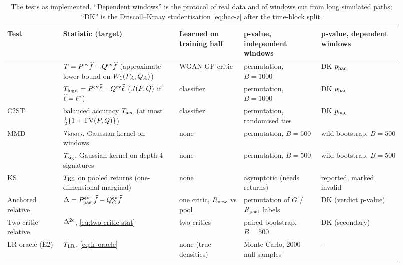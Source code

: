 \begin{table}[tbp]
  \centering
  \caption{The tests as implemented. ``Dependent windows'' is the protocol of real data and of
    windows cut from long simulated paths; ``DK'' is the Driscoll--Kraay studentisation
    \eqref{eq:hac-z} after the time-block split.}
  \label{tab:method-tests}
  \footnotesize
  \setlength{\tabcolsep}{4pt}
  \begin{tabular}{@{}>{\raggedright\arraybackslash}p{0.13\linewidth}
                  >{\raggedright\arraybackslash}p{0.27\linewidth}
                  >{\raggedright\arraybackslash}p{0.15\linewidth}
                  >{\raggedright\arraybackslash}p{0.18\linewidth}
                  >{\raggedright\arraybackslash}p{0.19\linewidth}@{}}
    \toprule
    Test & Statistic (target) & Learned on training half & p-value, independent windows &
    p-value, dependent windows \\
    \midrule
    \WC{} & $T=P^{\mathrm{ev}}\widehat{f}-Q^{\mathrm{ev}}\widehat{f}$ (approximate lower bound on $W_{1}(P_A,Q_A)$) & WGAN-GP critic &
      permutation, $B=1000$ & DK $p_{\mathrm{hac}}$ \\
    \LRC{} & $T_{\mathrm{logit}}=P^{\mathrm{ev}}\widehat{\ell}-Q^{\mathrm{ev}}\widehat{\ell}$ ($J(P,Q)$ if $\widehat{\ell}=\ell^{*}$) & classifier &
      permutation, $B=1000$ & DK $p_{\mathrm{hac}}$ \\
    C2ST & balanced accuracy $T_{\mathrm{acc}}$ (at most $\tfrac12\{1+\operatorname{TV}(P,Q)\}$) & classifier &
      permutation, randomised ties & DK $p_{\mathrm{hac}}$ \\
    MMD & $T_{\mathrm{MMD}}$, Gaussian kernel on windows & none & permutation, $B=500$ &
      wild bootstrap, $B=500$ \\
    \SigMMD{} & $T_{\mathrm{sig}}$, Gaussian kernel on depth-4 signatures & none & permutation, $B=500$ &
      wild bootstrap, $B=500$ \\
    KS & $T_{\mathrm{KS}}$ on pooled returns (one-dimensional marginal) & none & asymptotic (needs \iid{}
      returns) & reported, marked invalid \\
    \addlinespace
    Anchored relative & $\Delta=P_{\mathrm{past}}^{\mathrm{ev}}\widehat{f}-Q_{G}^{\mathrm{ev}}\widehat{f}$ & one critic, $R_{\mathrm{new}}$ vs pool &
      permutation of $G$ / $R_{\mathrm{past}}$ labels & DK (verdict p-value) \\
    Two-critic relative & $\Delta^{\mathrm{2c}}$, \eqref{eq:two-critic-stat} & two critics &
      paired bootstrap, $B=500$ & DK (secondary) \\
    \addlinespace
    LR oracle (E2) & $T_{\mathrm{LR}}$, \eqref{eq:lr-oracle} & none (true densities) &
      Monte Carlo, 2000 null samples & -- \\
    \bottomrule
  \end{tabular}
\end{table}

